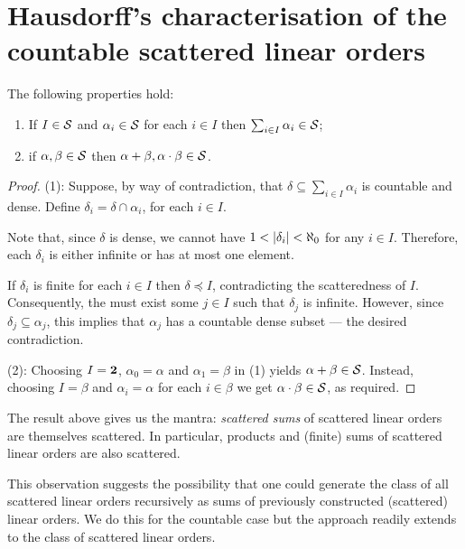 \section{Hausdorff's characterisation of the countable scattered linear orders}

\begin{prp}\label{prp:OpScattered}
        The following properties hold:
        \begin{enumerate}
			\item   If $I\in\mathcal{S}$ and $\alpha_i\in\mathcal{S}$ for each
				$i\in I$ then $\sum_{i\in I}\alpha_i\in\mathcal{S}$;
			\item   if $\alpha,\beta\in\mathcal{S}$ then
				$\alpha+\beta,\alpha\cdot\beta\in\mathcal{S}$.
        \end{enumerate}
\end{prp}
\begin{proof}
		(1):  Suppose, by way of contradiction, that $\delta\subseteq\sum_{i\in
		I}\alpha_i$ is countable and dense.  Define
		$\delta_i=\delta\cap\alpha_i$, for each $i\in I$.

		Note that, since $\delta$ is dense, we cannot have
		$1<\left\lvert\delta_i\right\rvert<\aleph_0$ for any $i\in I$.  Therefore, each
		$\delta_i$ is either infinite or has at most one element.

		If $\delta_i$ is finite for each $i\in I$ then $\delta\preceq I$,
		contradicting the scatteredness of $I$.  Consequently, the must exist
		some $j\in I$ such that $\delta_j$ is infinite.  However, since
		$\delta_j\subseteq\alpha_j$, this implies that $\alpha_j$ has a
		countable dense subset --- the desired contradiction.

		(2):  Choosing $I=\mathbf{2}$, $\alpha_0=\alpha$ and $\alpha_1=\beta$ in (1)
		yields $\alpha+\beta\in\mathcal{S}$.  Instead, choosing $I=\beta$ and
		$\alpha_i=\alpha$ for each $i\in\beta$ we get
		$\alpha\cdot\beta\in\mathcal{S}$, as required.
\end{proof}

The result above gives us the mantra: \textit{scattered sums} of scattered
linear orders are themselves scattered.  In particular, products and (finite)
sums of scattered linear orders are also scattered.

This observation suggests the possibility that one could generate the class of
all scattered linear orders recursively as sums of previously constructed
(scattered) linear orders.  We do this for the countable case but the approach
readily extends to the class of  scattered linear orders.

